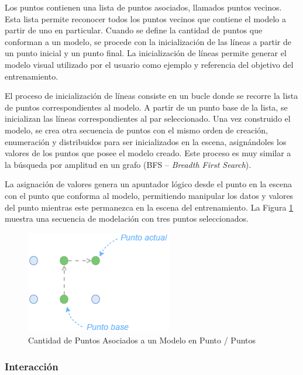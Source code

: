 \documentclass[conference]{IEEEtran}
\begin{document}
Los puntos contienen una lista de puntos asociados, llamados puntos vecinos. Esta lista permite reconocer todos los puntos vecinos que contiene el modelo a partir de uno en particular. Cuando se define la cantidad de puntos que conforman a un modelo, se procede con la inicialización de las líneas a partir de un punto inicial y un punto final. La inicialización de líneas permite generar el modelo visual utilizado por el usuario como ejemplo y referencia del objetivo del entrenamiento.

El proceso de inicialización de líneas consiste en un bucle donde se recorre la lista de puntos correspondientes al modelo. A partir de un punto base de la lista, se inicializan las líneas correspondientes al par seleccionado. Una vez construido el modelo, se crea otra secuencia de puntos con el mismo orden de creación, enumeración y distribuidos para ser inicializados en la escena, asignándoles los valores de los puntos que posee el modelo creado. Este proceso es muy similar a la búsqueda por amplitud en un grafo (BFS – \textit{Breadth First Search}).

La asignación de valores genera un apuntador lógico desde el punto en la escena con el punto que conforma al modelo, permitiendo manipular los datos y valores del punto mientras este permanezca en la escena del entrenamiento. La Figura \ref{fig:secupuntos} muestra una secuencia de modelación con tres puntos seleccionados.

\begin{figure}[htpb!]
 \centering 
\includegraphics[width=0.7\columnwidth]{images/secupuntos.png}
\caption{Cantidad de Puntos Asociados a un Modelo en Punto / Puntos}
\label{fig:secupuntos}
\end{figure}


\subsubsection*{Interacci\'on}
\end{document}

